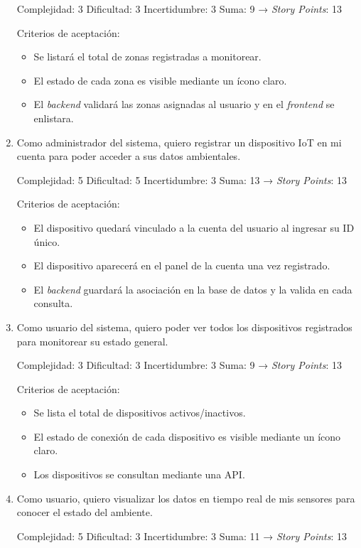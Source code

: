 \documentclass[
11pt, %
]{charter}
\begin{document}
\begin{enumerate}
	Complejidad: 3
	Dificultad: 3
	Incertidumbre: 3
	Suma: 9 → \textit{Story Points}: 13

	Criterios de aceptación:
	\begin{itemize}
		\item Se listará el total de zonas registradas a monitorear.
		\item El estado de cada zona es visible mediante un ícono claro.
		\item El \textit{backend} validará las zonas asignadas al usuario y en el \textit{frontend} se enlistara.
	\end{itemize}
	
		\item Como administrador del sistema, quiero registrar un dispositivo IoT en mi cuenta para poder acceder a sus datos ambientales.

	Complejidad: 5
	Dificultad: 5
	Incertidumbre: 3
	Suma: 13 → \textit{Story Points}: 13

	Criterios de aceptación:
	\begin{itemize}
		\item El dispositivo quedará vinculado a la cuenta del usuario al ingresar su ID único.
		\item El dispositivo aparecerá en el panel de la cuenta una vez registrado.
		\item El \textit{backend} guardará la asociación en la base de datos y la valida en cada consulta.
	\end{itemize}
	\item Como usuario del sistema, quiero poder ver todos los dispositivos registrados para monitorear su estado general.

	Complejidad: 3
	Dificultad: 3
	Incertidumbre: 3
	Suma: 9 → \textit{Story Points}: 13

	Criterios de aceptación:
	\begin{itemize}
		\item Se lista el total de dispositivos activos/inactivos.
		\item El estado de conexión de cada dispositivo es visible mediante un ícono claro.
		\item Los dispositivos se consultan mediante una API.
	\end{itemize}
	
		\item Como usuario, quiero visualizar los datos en tiempo real de mis sensores para conocer el estado del ambiente.

	Complejidad: 5
	Dificultad: 3
	Incertidumbre: 3
	Suma: 11 → \textit{Story Points}: 13


\end{enumerate}
\end{document}
